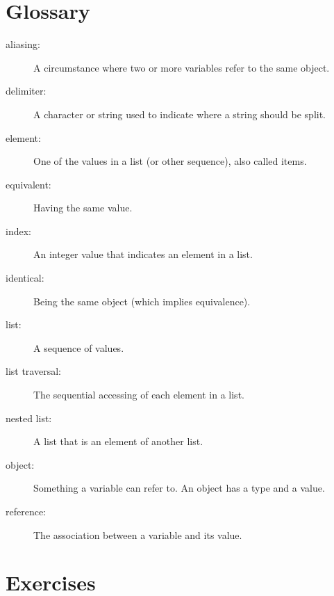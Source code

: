 \section{Glossary}

\begin{description}

\item[aliasing:] A circumstance where two or more variables refer to the same
object.

\item[delimiter:] A character or string used to indicate where a
string should be split.

\item[element:] One of the values in a list (or other sequence),
also called items.

\item[equivalent:] Having the same value.

\item[index:] An integer value that indicates an element in a list.

\item[identical:] Being the same object (which implies equivalence).

\item[list:] A sequence of values.

\item[list traversal:] The sequential accessing of each element in a list.

\item[nested list:] A list that is an element of another list.

\item[object:] Something a variable can refer to.  An object
has a type and a value.

\item[reference:] The association between a variable and its value.

\end{description}


\section{Exercises}

